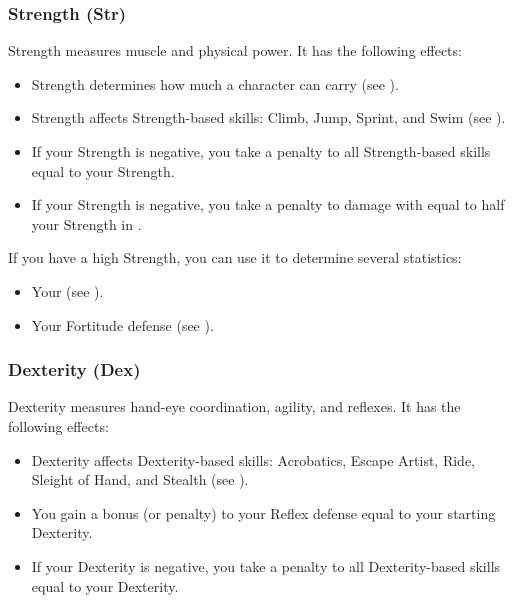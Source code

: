         \subsubsection{Strength (Str)}\label{Strength}
            Strength measures muscle and physical power.
            It has the following effects:
            \begin{itemize}
                \item Strength determines how much a character can carry (see ).
                \item Strength affects Strength-based skills: Climb, Jump, Sprint, and Swim (see ).
                \item If your Strength is negative, you take a penalty to all Strength-based skills equal to your Strength.
                \item If your Strength is negative, you take a penalty to damage with  equal to half your Strength in .
            \end{itemize}

            If you have a high Strength, you can use it to determine several statistics:
            \begin{itemize}
                \item Your  (see ).
                \item Your Fortitude defense (see ).
            \end{itemize}

        \subsubsection{Dexterity (Dex)}\label{Dexterity}
            Dexterity measures hand-eye coordination, agility, and reflexes.
            It has the following effects:
            \begin{itemize}
                \item Dexterity affects Dexterity-based skills: Acrobatics, Escape Artist, Ride, Sleight of Hand, and Stealth (see ).
                \item You gain a bonus (or penalty) to your Reflex defense equal to your starting Dexterity.
                \item If your Dexterity is negative, you take a penalty to all Dexterity-based skills equal to your Dexterity.
            \end{itemize}

